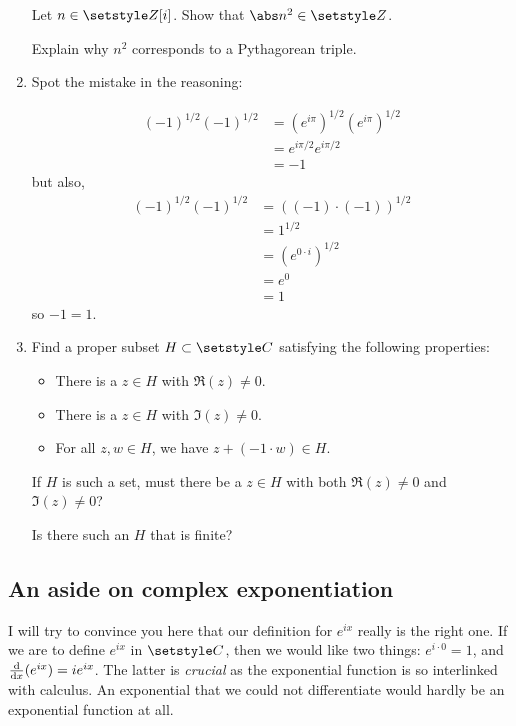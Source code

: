 \begin{enumerate}
  Let \(n \in \Integers[i]\). Show that \(\abs n^2 \in \Integers\).

  Explain why \(n^2\) corresponds to a Pythagorean triple.
 \item \label{q_comp_zw_exp}
  Spot the mistake in the reasoning:
  \begin{tcolorbox}
   \begin{align*}
    (-1)^{1/2} (-1)^{1/2}
     &= (e^{i\pi})^{1/2} (e^{i\pi})^{1/2} \\
     &= e^{i\pi/2} e^{i\pi/2} \\
     &= -1
   \end{align*}
   but also,
   \begin{align*}
    (-1)^{1/2} (-1)^{1/2}
     &= ((-1) \cdot (-1))^{1/2} \\
     &= 1^{1/2} \\
     &= (e^{0 \cdot i})^{1/2} \\
     &= e^0 \\
     &= 1
   \end{align*}
   so \(-1 = 1\).
  \end{tcolorbox}
 \item
  Find a proper subset \(H \subset \Complex\) satisfying the following
  properties:
  \begin{itemize}
   \item
    There is a \(z \in H\) with \(\Re(z) \ne 0\).
   \item
    There is a \(z \in H\) with \(\Im(z) \ne 0\).
   \item
    For all \(z, w \in H\), we have \(z  + (-1 \cdot w) \in H\).
  \end{itemize}
  If \(H\) is such a set, must there be a \(z \in H\) with both
  \(\Re(z) \ne 0\) and \(\Im(z) \ne 0\)?

  Is there such an \(H\) that is finite?
\end{enumerate}

\subsection{An aside on complex exponentiation}

I will try to convince you here that our definition for \(e^{ix}\) really is the
right one. If we are to define \(e^{ix}\) in \(\Complex\), then we would like
two things: \(e^{i \cdot 0} = 1\), and \(\dv{x} (e^{ix}) = ie^{ix}\). The latter
is \emph{crucial} as the exponential function is so interlinked with calculus.
An exponential that we could not differentiate would hardly be an exponential
function at all.

